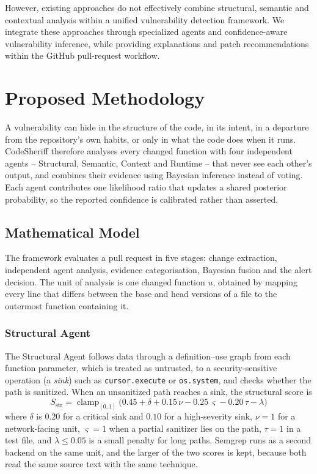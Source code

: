 \documentclass[conference]{IEEEtran}
\begin{document}
However, existing approaches do not effectively combine structural, semantic and contextual analysis within a unified vulnerability detection framework. We integrate these approaches through specialized agents and confidence-aware vulnerability inference, while providing explanations and patch recommendations within the GitHub pull-request workflow.

\section{Proposed Methodology} \label{PS}

A vulnerability can hide in the structure of the code, in its intent, in a
departure from the repository's own habits, or only in what the code does
when it runs. CodeSheriff therefore analyses every changed function with
four independent agents -- Structural, Semantic, Context and Runtime --
that never see each other's output, and combines their evidence using
Bayesian inference instead of voting. Each agent contributes one likelihood
ratio that updates a shared posterior probability, so the reported
confidence is calibrated rather than asserted.

\subsection{Mathematical Model}

The framework evaluates a pull request in five stages: change extraction,
independent agent analysis, evidence categorisation, Bayesian fusion and
the alert decision. The unit of analysis is one changed function $u$,
obtained by mapping every line that differs between the base and head
versions of a file to the outermost function containing it.

\subsubsection{Structural Agent}
The Structural Agent follows data through a definition--use graph from each
function parameter, which is treated as untrusted, to a security-sensitive
operation (a \emph{sink}) such as \texttt{cursor.execute} or
\texttt{os.system}, and checks whether the path is sanitized. When an
unsanitized path reaches a sink, the structural score is
\begin{equation}
S_{\mathrm{str}}=\operatorname{clamp}_{[0,1]}\bigl(0.45+\delta+0.15\,\nu-0.25\,\varsigma-0.20\,\tau-\lambda\bigr)
\label{eq:str}
\end{equation}
where $\delta$ is $0.20$ for a critical sink and $0.10$ for a high-severity
sink, $\nu=1$ for a network-facing unit, $\varsigma=1$ when a partial
sanitizer lies on the path, $\tau=1$ in a test file, and $\lambda\le0.05$
is a small penalty for long paths. Semgrep runs as a second backend on the
same unit, and the larger of the two scores is kept, because both read the
same source text with the same technique.
\end{document}
